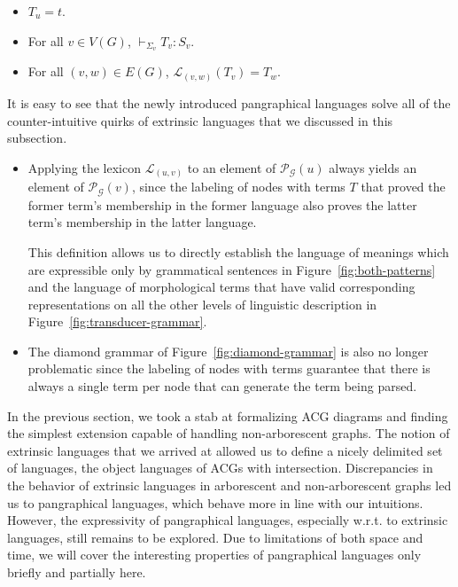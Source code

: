 \begin{itemize}
  \item $T_u = t$.
  \item For all $v \in V(G)$, $\vdash_{\Sigma_v} T_v : S_v$.
  \item For all $(v,w) \in E(G)$, $\mathcal{L}_{(v,w)}(T_v) = T_w$.
\end{itemize}

It is easy to see that the newly introduced pangraphical languages solve
all of the counter-intuitive quirks of extrinsic languages that we
discussed in this subsection.

\begin{itemize}
\item Applying the lexicon $\mathcal{L}_{(u,v)}$ to an element of
  $\mathcal{P}_{\mathcal{G}}(u)$ always yields an element of
  $\mathcal{P}_{\mathcal{G}}(v)$, since the labeling of nodes with terms
  $T$ that proved the former term's membership in the former language
  also proves the latter term's membership in the latter language.

  This definition allows us to directly establish the language of
  meanings which are expressible only by grammatical sentences in
  Figure~\ref{fig:both-patterns} and the language of morphological terms
  that have valid corresponding representations on all the other levels
  of linguistic description in Figure~\ref{fig:transducer-grammar}.
\item The diamond grammar of Figure~\ref{fig:diamond-grammar} is also no
  longer problematic since the labeling of nodes with terms guarantee
  that there is always a single term per node that can generate the term
  being parsed.
\end{itemize}

In the previous section, we took a stab at formalizing ACG diagrams and
finding the simplest extension capable of handling non-arborescent
graphs. The notion of extrinsic languages that we arrived at allowed us
to define a nicely delimited set of languages, the object languages of
ACGs with intersection. Discrepancies in the behavior of extrinsic
languages in arborescent and non-arborescent graphs led us to
pangraphical languages, which behave more in line with our
intuitions. However, the expressivity of pangraphical languages,
especially w.r.t. to extrinsic languages, still remains to be
explored. Due to limitations of both space and time, we will cover the
interesting properties of pangraphical languages only briefly and
partially here.

